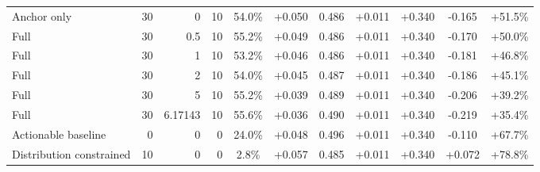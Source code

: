 \begin{table}[htbp]
\begin{tabular}{lrrrccccccc}
Anchor only & 30 & 0 & 10 & 54.0\% & +0.050 & 0.486 & +0.011 & +0.340 & -0.165 & +51.5\% \\
Full & 30 & 0.5 & 10 & 55.2\% & +0.049 & 0.486 & +0.011 & +0.340 & -0.170 & +50.0\% \\
Full & 30 & 1 & 10 & 53.2\% & +0.046 & 0.486 & +0.011 & +0.340 & -0.181 & +46.8\% \\
Full & 30 & 2 & 10 & 54.0\% & +0.045 & 0.487 & +0.011 & +0.340 & -0.186 & +45.1\% \\
Full & 30 & 5 & 10 & 55.2\% & +0.039 & 0.489 & +0.011 & +0.340 & -0.206 & +39.2\% \\
Full & 30 & 6.17143 & 10 & 55.6\% & +0.036 & 0.490 & +0.011 & +0.340 & -0.219 & +35.4\% \\
Actionable baseline & 0 & 0 & 0 & 24.0\% & +0.048 & 0.496 & +0.011 & +0.340 & -0.110 & +67.7\% \\
Distribution constrained & 10 & 0 & 0 & 2.8\% & +0.057 & 0.485 & +0.011 & +0.340 & +0.072 & +78.8\% \\
\bottomrule
\end{tabular}
\end{table}
